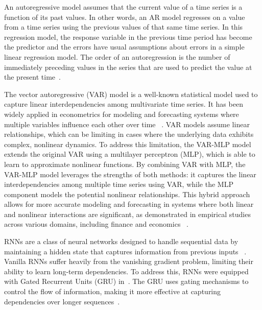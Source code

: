 An autoregressive model assumes that the current value of a time series is a
function of its past values. In other words, an AR model regresses on a value
from a time series using the previous values of that same time series. In this
regression model, the response variable in the previous time period has become
the predictor and the errors have usual assumptions about errors in a simple
linear regression model. The order of an autoregression is the number of
immediately preceding values in the series that are used to predict the value at
the present time~\citep{penn}. 

The vector autoregressive (VAR) model is a well-known statistical model used to
capture linear interdependencies among multivariate time series. It has been
widely applied in econometrics for modeling and forecasting systems where
multiple variables influence each other over time ~\citep{lutkepohl2005new}.
VAR models assume linear relationships, which can be limiting in cases
where the underlying data exhibits complex, nonlinear dynamics. To address this
limitation, the VAR-MLP model extends the original VAR using a multilayer perceptron (MLP), which is able to learn to approximate nonlinear functions. By
combining VAR with MLP, the VAR-MLP model leverages the strengths of both
methods: it captures the linear interdependencies among multiple time series
using VAR, while the MLP component models the potential nonlinear relationships.
This hybrid approach allows for more accurate modeling and
forecasting in systems where both linear and nonlinear interactions are
significant, as demonstrated in empirical studies across various domains,
including finance and economics ~\citep{zhang2003time, zivot2006modeling}. 

RNNs are a class of neural networks designed to handle sequential data by
maintaining a hidden state that captures information from previous inputs
~\citep{hochreiter1997long}. Vanilla RNNs suffer heavily from the vanishing
gradient problem, limiting their ability to learn long-term dependencies. To
address this, RNNs were equipped with Gated Recurrent Units (GRU)
in~\citep{cho2014learning}. The GRU uses gating mechanisms to control the flow
of information, making it more effective at capturing dependencies over longer
sequences~\citep{chung2014empirical}. 

